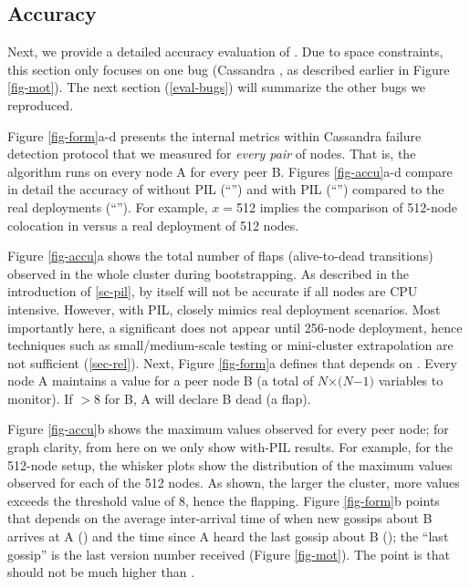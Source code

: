 




\subsection{Accuracy}
\label{eval-accu}












Next, we provide a detailed accuracy evaluation of \sck.  Due to space
constraints, this section only focuses on one bug (Cassandra \caone
\cite{CA-One}, as described earlier in Figure \sec\ref{fig-mot}).  The
next section (\sec\ref{eval-bugs}) will summarize the other bugs we reproduced.


Figure \ref{fig-form}a-d presents the  internal metrics within
Cassandra failure detection protocol that we measured for {\em every pair}
of nodes.  That is, the algorithm runs on every node A for every peer B.
%
Figures \ref{fig-accu}a-d compare in detail the accuracy of \stest without
PIL (``'') and \stestp with PIL (``'') compared to
the real deployments (``'').
%
For example, $x$$=$512 implies the comparison of 512-node colocation in
\sck versus a real deployment of 512 nodes.



Figure \ref{fig-accu}a shows the total number of flaps (alive-to-dead
transitions) observed in the whole cluster during bootstrapping.  
As described in the introduction of \sec\ref{sc-pil}, 
\stest by itself will not be accurate if all nodes are CPU intensive. 
%
However, with PIL, \sck closely mimics real deployment scenarios.  Most
importantly here, a significant \flaps does not appear until 256-node
deployment, hence techniques such as small/medium-scale testing or
mini-cluster extrapolation are not sufficient (\sec\ref{sec-rel}).
%
Next, Figure \ref{fig-form}a defines that \flaps depends on \phi
\cite{Hayashibara+04-PhiFailureDetector}.  Every node A maintains a \phi
value for a peer node B (a total of $N$$\times$$(N$$-$$1)$ variables to
monitor).  If \phi$>$8 for B, A will declare B dead (a flap).




Figure \ref{fig-accu}b shows the maximum \phi values observed for every
peer node; for graph clarity, from here on we only show with-PIL results.
%
For example, for the 512-node setup, the whisker plots show the
distribution of the maximum \phi values observed for each of the 512
nodes.  As shown, the larger the cluster, more \phi values exceeds the
threshold value of 8, hence the flapping.
%
Figure \ref{fig-form}b points that \phi depends on the average
inter-arrival time of when new gossips about B arrives at A (\gosAvg) and
the time since A heard the last gossip about B (\gosLast); the ``last
gossip'' is the last version number received (Figure \sec\ref{fig-mot}).
The point is that \gosLast should not be much higher than \gosAvg.



